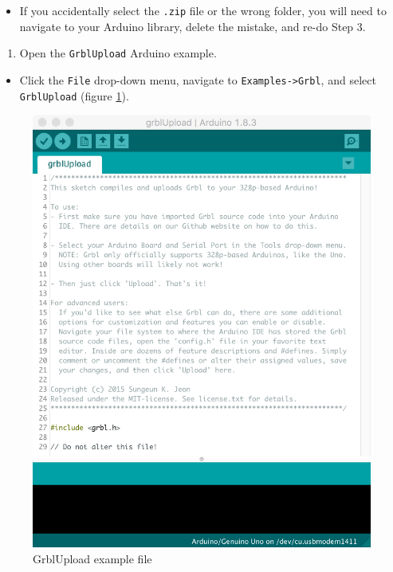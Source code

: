 \documentclass[]{book}
\providecommand{\tightlist}{%
  \setlength{\itemsep}{0pt}\setlength{\parskip}{0pt}}
\theoremstyle{definition}
\theoremstyle{definition}
\theoremstyle{definition}
\theoremstyle{remark}
\begin{document}
\begin{itemize}
\tightlist
\item
  If you accidentally select the \texttt{.zip} file or the wrong folder,
  you will need to navigate to your Arduino library, delete the mistake,
  and re-do Step 3.
\end{itemize}

\begin{enumerate}
\def\labelenumi{\arabic{enumi}.}
\setcounter{enumi}{3}
\tightlist
\item
  Open the \texttt{GrblUpload} Arduino example.
\end{enumerate}

\begin{itemize}
\tightlist
\item
  Click the \texttt{File} drop-down menu, navigate to
  \texttt{Examples-\textgreater{}Grbl}, and select \texttt{GrblUpload}
  (figure \ref{fig:grblUploadFile}).
\end{itemize}

\begin{figure}

{\centering \includegraphics[width=0.75\linewidth]{images/grbl_upload_file} 

}

\caption{GrblUpload example file}\label{fig:grblUploadFile}
\end{figure}
\end{document}
